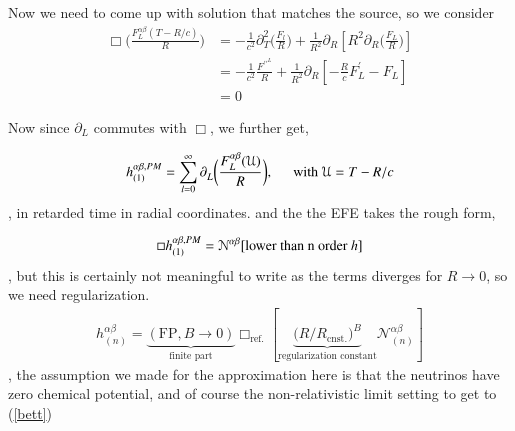 \documentclass[a4paper, 12pt]{article}
\begin{document}
  Now we need to come up with solution that matches the source, so we
  consider 
  \begin{align}
    \label{matching up source}
    \Box\bigg( \frac{F_{L}^{\alpha \beta}(T - R/c)}{R}  \bigg) &= -
    \frac{1}{c^2} \partial_{T}^{2} \bigg( \frac{F_l}{R} \bigg) +
    \frac{1}{R^2} \partial_{R}^{} [ R^2 \partial_{R}^{} \bigg(
    \frac{F_L}{R} \bigg)  ] \\ 
    &= - \frac{1}{c^2} \frac{F^{\prime \prime}^{L}}{R} + \frac{1}{R^2}
    \partial_{R}^{} [ - \frac{R}{c} F_{L}^{\prime} - F_L ] \\ 
    &= 0 
  \end{align}

Now since \( \partial_{L}^{}  \) commutes with \( \Box \), we further get, 

\begin{align}
  \label{partial commuting box}
    h_{(1)}^{\alpha\beta, PM} = \sum_{l=0}^{\infty} \partial_{L}^{}
    \bigg( \frac{F_{L}^{\alpha \beta}(\mathcal{U})}{R} \bigg),
    \hspace{0.5cm} \textnormal{with } \mathcal{U} = T - R/c
\end{align}, in retarded time in radial coordinates. 
and the the EFE takes the rough form, 

\begin{align}
  \label{EFE form under of 1st order in PN}
  \Box h_{(1)}^{\alpha \beta, PM} = \mathcal{N}^{\alpha\beta}[
  \textnormal{lower than n order }h ] 
\end{align}, but this is certainly not meaningful to write as the terms
diverges for \( R \to 0 \), so we need regularization. 
\begin{align}
  \label{better looking}
  h_{(n)}^{\alpha\beta} = \underbrace{ (\mathrm{FP,} B\to 0)
  }_{\textrm{finite part}} \Box_{\mathrm{ref.}} [
  \underbrace{\bigg( R/ R_{\mathrm{cnst.}} \bigg)^{B}
  }_{\textrm{regularization constant}} \mathcal{N}_{(n)}^{\alpha \beta} ]
\end{align}, the assumption we made for the approximation here is that the
neutrinos have zero chemical potential, and of course the non-relativistic
limit setting to get to (\ref{bett})
\end{document}
